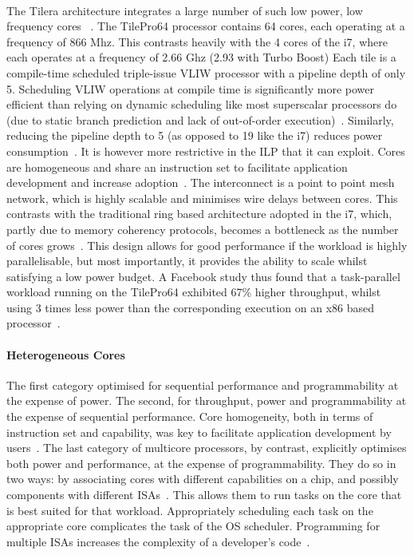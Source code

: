 \paragraph{} The Tilera architecture  integrates a large number of such low power, 
low frequency cores ~\cite{wentzlaff2007tile}. The TilePro64 processor contains 
64 cores, each operating at a frequency of 866 Mhz. This contrasts heavily
with the 4 cores of the i7, where each operates at a frequency of 2.66 Ghz (2.93 with
Turbo Boost)  Each tile is a compile-time scheduled triple-issue VLIW processor with 
a pipeline depth of only 5. Scheduling VLIW operations at compile time is 
significantly more power efficient
than relying on dynamic scheduling like most superscalar processors do (due to
static branch prediction and lack of out-of-order execution)~\cite{hennessy2006comparchquantitative}. Similarly,
reducing the pipeline depth to 5 (as opposed to 19 like the i7) reduces
power consumption~\cite{Borkar:2007:TCC:1278480.1278667}. 
It is however more restrictive in the ILP that it can exploit. Cores are homogeneous and share 
an instruction set to facilitate application development and increase adoption~\cite{wentzlaff2007tile}. The interconnect is a point to point mesh network, which
is highly scalable and minimises wire delays between cores. This
contrasts with the traditional ring based architecture adopted in the i7,  
which, partly due to memory coherency protocols, becomes a bottleneck
as the number of cores grows~\cite{1431574}. This design allows for good performance
if the workload is highly parallelisable, but most
importantly, it provides the ability to scale whilst satisfying a low power budget. A Facebook study thus found that a task-parallel workload running on the TilePro64 exhibited
67\% higher throughput, whilst using 3 times less power than the corresponding
execution on an x86 based processor~\cite{berezecki2011manycore}. 

\paragraph{Heterogeneous Cores} The first category optimised for 
sequential performance and programmability at the expense of power. The second, 
for throughput, power and programmability at the expense of sequential performance. 
Core homogeneity, both in terms of instruction set and capability,
was key to facilitate application development by users~\cite{balakrishnan2005impactperfasym}. The last category
of multicore processors, by contrast, explicitly optimises both
power and performance, at the expense of programmability. They do so in two ways: 
by associating cores with different capabilities on a chip, and possibly components
with different ISAs~\cite{kumar:2004:SHM:998680.1006707,5695539,Kumar:2005:HCM:1100859.1100890,5695539,5695539,FSSP:09}. This allows them to run tasks on the core
that is best suited for that workload. Appropriately scheduling each 
task on the appropriate core complicates the task of the OS scheduler.
Programming for multiple ISAs increases the complexity of a developer's code~\cite{McIlroy:2010:HRS:1869459.1869478}. 

